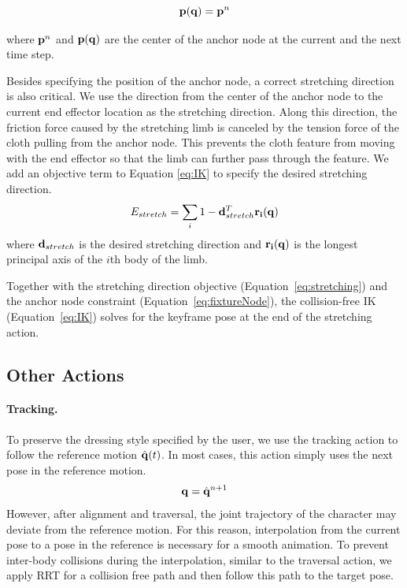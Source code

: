 \begin{equation}
  \mathbf{p}(\mathbf{q}) = \mathbf{p}^n
  \label{eq:fixtureNode}
\end{equation}

where $\mathbf{p}^n$ and $\mathbf{p(q)}$ are the center of the anchor node at the current and the next time step.

Besides specifying the position of the anchor node, a correct stretching direction is also critical. We use the direction from the center of the anchor node to the current end effector location as the stretching direction. Along this direction, the friction force caused by the stretching limb is canceled by the tension force of the cloth pulling from the anchor node. This prevents the cloth feature from moving with the end effector so that the limb can further pass through the feature. We add an objective term to Equation \ref{eq:IK} to specify the desired stretching direction.
\begin{equation}
  E_{stretch} = \sum_i1 - \mathbf{d}_{stretch}^T\mathbf{r_i(q)}
  \label{eq:stretching}
\end{equation}
where $\mathbf{d}_{stretch}$ is the desired stretching direction and $\mathbf{r_i(q)}$ is the longest principal axis of the $i$th body of the limb. 

Together with the stretching direction objective (Equation~\ref{eq:stretching}) and the anchor node constraint (Equation~\ref{eq:fixtureNode}), the collision-free IK (Equation~\ref{eq:IK}) solves for the keyframe pose at the end of the stretching action.

\subsection{Other Actions}

\paragraph{Tracking.} To preserve the dressing style specified by the user, we use the tracking action to follow the reference motion $\hat{\mathbf{q}}(t)$. In most cases, this action simply uses the next pose in the reference motion.
\begin{displaymath}
\mathbf{q} = \hat{\mathbf{q}}^{n+1}
\end{displaymath}
However, after alignment and traversal, the joint trajectory of the character may deviate from the reference motion. For this reason, interpolation from the current pose to a pose in the reference is necessary for a smooth animation. To prevent inter-body collisions during the interpolation, similar to the traversal action, we apply RRT for a collision free path and then follow this path to the target pose.


